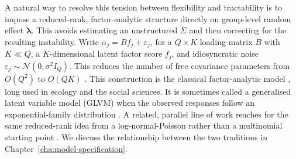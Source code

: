 A natural way to resolve this tension between flexibility and tractability is to impose a reduced-rank, factor-analytic structure directly on group-level random effect $\bm{\lambda}$. This avoids estimating an unstructured $\Sigma$ and then correcting for the resulting instability. Write $\alpha_j = B f_j + \varepsilon_j$, for a $Q \times K$ loading matrix $B$ with $K \ll Q$, a $K$-dimensional latent factor score $f_j$, and idiosyncratic noise $\varepsilon_j \sim \mathcal{N}(0, \sigma^2 I_Q)$. This reduces the number of free covariance parameters from $O(Q^2)$ to $O(QK)$ \citep{Bartholomew2011}. This construction is the classical factor-analytic model \citep{AndersonRubin1956,Bartholomew2011}, long used in ecology and the social sciences. It is sometimes called a generalised latent variable model (GLVM) when the observed responses follow an exponential-family distribution \citep{Anders2004}. A related, parallel line of work reaches for the same reduced-rank idea from a log-normal-Poisson rather than a multinomial starting point \citep{chiquet2018variational}. We discuss the relationship between the two traditions in Chapter~\ref{cha:model-specification}.